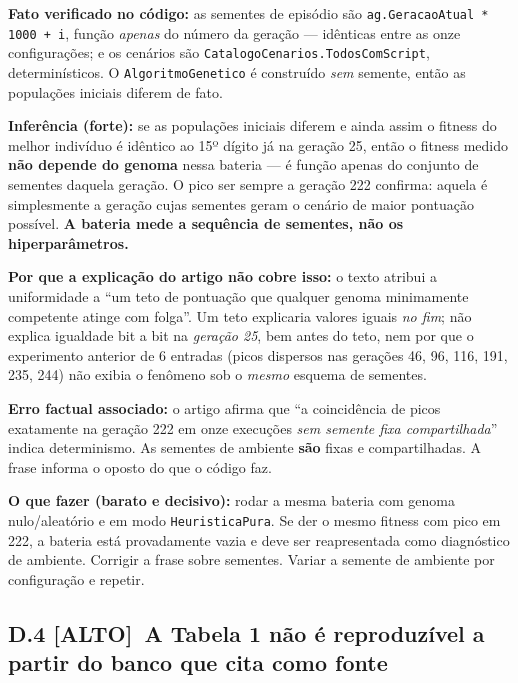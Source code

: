\documentclass[11pt,a4paper]{article}
\newcommand{\alto}{\textbf{\color{orange!70!black}[ALTO]}}
\begin{document}
\textbf{Fato verificado no código:} as sementes de episódio são \texttt{ag.GeracaoAtual * 1000 + i},
função \emph{apenas} do número da geração --- idênticas entre as onze configurações; e os cenários
são \texttt{CatalogoCenarios.TodosComScript}, determinísticos. O \texttt{AlgoritmoGenetico} é
construído \emph{sem} semente, então as populações iniciais diferem de fato.

\textbf{Inferência (forte):} se as populações iniciais diferem e ainda assim o fitness do melhor
indivíduo é idêntico ao 15º dígito já na geração 25, então o fitness medido \textbf{não depende do
genoma} nessa bateria --- é função apenas do conjunto de sementes daquela geração. O pico ser sempre
a geração 222 confirma: aquela é simplesmente a geração cujas sementes geram o cenário de maior
pontuação possível. \textbf{A bateria mede a sequência de sementes, não os hiperparâmetros.}

\textbf{Por que a explicação do artigo não cobre isso:} o texto atribui a uniformidade a ``um teto de
pontuação que qualquer genoma minimamente competente atinge com folga''. Um teto explicaria valores
iguais \emph{no fim}; não explica igualdade bit a bit na \emph{geração 25}, bem antes do teto, nem
por que o experimento anterior de 6 entradas (picos dispersos nas gerações 46, 96, 116, 191, 235,
244) não exibia o fenômeno sob o \emph{mesmo} esquema de sementes.

\textbf{Erro factual associado:} o artigo afirma que ``a coincidência de picos exatamente na geração
222 em onze execuções \emph{sem semente fixa compartilhada}'' indica determinismo. As sementes de
ambiente \textbf{são} fixas e compartilhadas. A frase informa o oposto do que o código faz.

\textbf{O que fazer (barato e decisivo):} rodar a mesma bateria com genoma nulo/aleatório e em modo
\texttt{HeuristicaPura}. Se der o mesmo fitness com pico em 222, a bateria está provadamente vazia e
deve ser reapresentada como diagnóstico de ambiente. Corrigir a frase sobre sementes. Variar a
semente de ambiente por configuração e repetir.

\subsection*{D.4 \alto\ A Tabela 1 não é reproduzível a partir do banco que cita como fonte}
\end{document}
